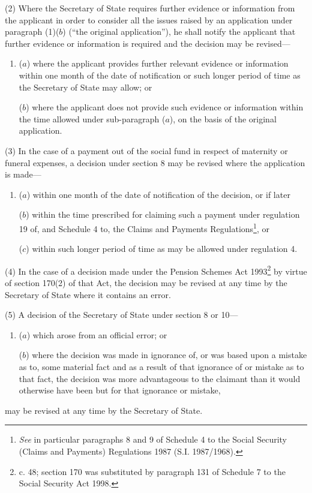 \documentclass[12pt,a4paper]{article}
\begin{document}
(2) Where the Secretary of State requires further evidence or information from the applicant in order to consider all the issues raised by an application under paragraph (1)($b$) (“the original application”), he shall notify the applicant that further evidence or information is required and the decision may be revised—
\begin{enumerate}\item[]
($a$) where the applicant provides further relevant evidence or information within one month of the date of notification or such longer period of time as the Secretary of State may allow; or

($b$) where the applicant does not provide such evidence or information within the time allowed under sub-paragraph ($a$), on the basis of the original application.
\end{enumerate}

(3) In the case of a payment out of the social fund in respect of maternity or funeral expenses, a decision under section 8 may be revised where the application is made—
\begin{enumerate}\item[]
($a$) within one month of the date of notification of the decision, or if later

($b$) within the time prescribed for claiming such a payment under regulation 19 of, and Schedule 4 to, the Claims and Payments Regulations\footnote{\frenchspacing \emph{See} in particular paragraphs 8 and 9 of Schedule 4 to the Social Security (Claims and Payments) Regulations 1987 (S.I. 1987/1968).}, or

($c$) within such longer period of time as may be allowed under regulation 4.
\end{enumerate}

(4) In the case of a decision made under the Pension Schemes Act 1993\footnote{ c. 48; section 170 was substituted by paragraph 131 of Schedule 7 to the Social Security Act 1998.} by virtue of section 170(2) of that Act, the decision may be revised at any time by the Secretary of State where it contains an error.

(5) A decision of the Secretary of State under section 8 or 10—
\begin{enumerate}\item[]
($a$) which arose from an official error; or

($b$) where the decision was made in ignorance of, or was based upon a mistake as to, some material fact and as a result of that ignorance of or mistake as to that fact, the decision was more advantageous to the claimant than it would otherwise have been but for that ignorance or mistake,
\end{enumerate}
may be revised at any time by the Secretary of State.
\end{document}
